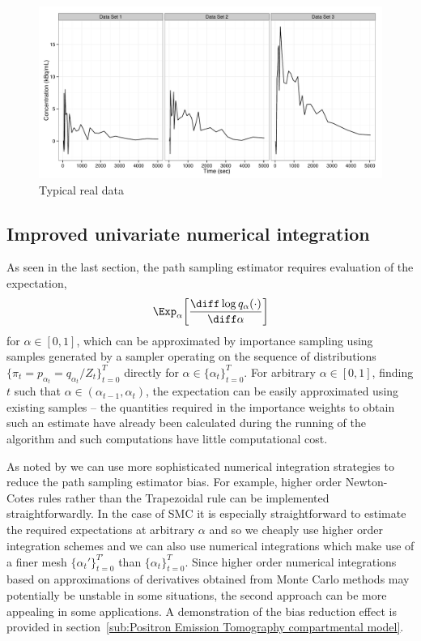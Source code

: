 \begin{figure}[t]
  \includegraphics[width=\linewidth]{fig/Typical_PET}
  \caption{Typical real \pet data}
  \label{fig:typical real pet}
\end{figure}

\subsection{Improved univariate numerical integration}
\label{sub:Improved univariate numerical integration}

As seen in the last section, the path sampling estimator requires evaluation
of the expectation,
\begin{equation*}
  \Exp_\alpha \biggl[ \frac{\diff\log q_{\alpha}(\cdot)}{\diff\alpha} \biggr]
\end{equation*}
for $\alpha\in[0,1]$, which can be approximated by importance sampling using
samples generated by a \smc sampler operating on the sequence of distributions
$\{\pi_t = p_{\alpha_t} = q_{\alpha_t}/Z_t\}_{t=0}^T$ directly for
$\alpha\in\{\alpha_t\}_{t=0}^T$. For arbitrary $\alpha\in[0,1]$, finding $t$
such that $\alpha\in(\alpha_{t-1},\alpha_t)$, the expectation can be easily
approximated using existing \smc samples -- the quantities required in the
importance weights to obtain such an estimate have already been calculated
during the running of the \smc algorithm and such computations have little
computational cost. %

As noted by \cite{Friel:2012}  we can use more sophisticated numerical
integration strategies to reduce the path sampling estimator bias. For
example, higher order Newton-Cotes rules rather than the Trapezoidal rule can
be implemented straightforwardly. In the case of SMC it is especially
straightforward to estimate the required expectations at arbitrary $\alpha$
and so we cheaply use higher order integration schemes and we can also use
numerical integrations which make use of a finer mesh
$\{\alpha_t'\}_{t=0}^{T'}$ than $\{\alpha_t\}_{t=0}^T$. Since higher order
numerical integrations based on approximations of derivatives obtained from
Monte Carlo methods may potentially be unstable in some situations, the second
approach can be more appealing in some applications. A demonstration of the
bias reduction effect is provided in section~\ref{sub:Positron Emission
  Tomography compartmental model}.

